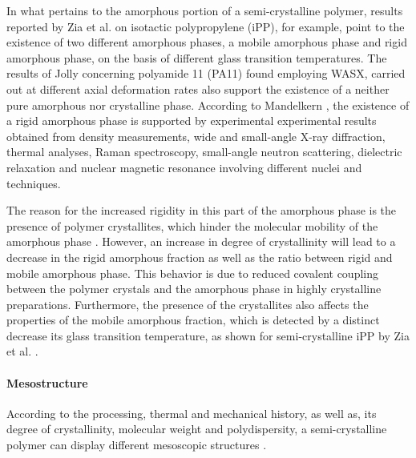 In what pertains to the amorphous portion of a semi-crystalline polymer, results reported by Zia et al. \citep{ziaRigidAmorphousFraction2008} on isotactic polypropylene (iPP), for example, point to the existence of two different amorphous phases, a mobile amorphous phase and rigid amorphous phase, on the basis of different glass transition temperatures.
The results of Jolly \citep{jollyAnalyseMicrostructurePolyamide2000} concerning polyamide 11 (PA11) found employing WASX, carried out at different axial deformation rates also support the existence of a neither pure amorphous nor crystalline phase.
According to Mandelkern \citep{mandelkernCrystallinePolymerReminiscences2006}, the existence of a rigid amorphous phase is supported by experimental experimental results obtained from density measurements, wide and small-angle X-ray diffraction, thermal analyses, Raman spectroscopy, small-angle neutron scattering, dielectric relaxation and nuclear magnetic resonance involving different nuclei and techniques.

The reason for the increased rigidity in this part of the amorphous phase is the presence of polymer crystallites, which hinder the molecular mobility of the amorphous phase \citep{ziaRigidAmorphousFraction2008, peacockHandbookPolyethyleneStructures2014}.
However, an increase in degree of crystallinity will lead to a decrease in the rigid amorphous fraction as well as the ratio between rigid and mobile amorphous phase.
This behavior is due to reduced covalent coupling between the polymer crystals and the amorphous phase in highly crystalline preparations\citep{ziaRigidAmorphousFraction2008}.
Furthermore, the presence of the crystallites also affects the properties of the mobile amorphous fraction, which is detected by a distinct decrease its glass transition temperature, as shown for semi-crystalline iPP by Zia et al. \citep{ziaRigidAmorphousFraction2008}.

\paragraph{Mesostructure}
According to the processing, thermal and mechanical history, as well as, its degree of crystallinity, molecular weight and polydispersity, a semi-crystalline polymer can display different mesoscopic structures \citep{cangemiTwoPhaseModelMechanical2001, mandelkernCrystallinePolymerReminiscences2006}.

